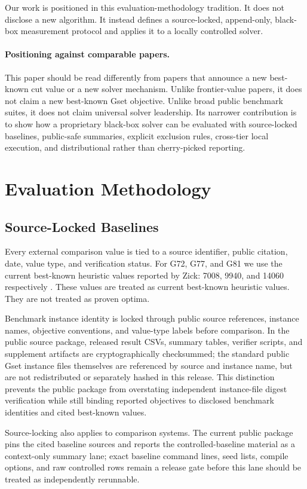 \documentclass[11pt]{article}
\begin{document}
Our work is positioned in this evaluation-methodology tradition. It does not disclose a new algorithm. It instead defines a source-locked, append-only, black-box measurement protocol and applies it to a locally controlled solver.

\paragraph{Positioning against comparable papers.}
This paper should be read differently from papers that announce a new best-known cut value or a new solver mechanism. Unlike frontier-value papers, it does not claim a new best-known Gset objective. Unlike broad public benchmark suites, it does not claim universal solver leadership. Its narrower contribution is to show how a proprietary black-box solver can be evaluated with source-locked baselines, public-safe summaries, explicit exclusion rules, cross-tier local execution, and distributional rather than cherry-picked reporting.

\section{Evaluation Methodology}
\subsection{Source-Locked Baselines}
Every external comparison value is tied to a source identifier, public citation, date, value type, and verification status. For G72, G77, and G81 we use the current best-known heuristic values reported by Zick: 7008, 9940, and 14060 respectively \cite{zick2025}. These values are treated as current best-known heuristic values. They are not treated as proven optima.

Benchmark instance identity is locked through public source references, instance names, objective conventions, and value-type labels before comparison. In the public source package, released result CSVs, summary tables, verifier scripts, and supplement artifacts are cryptographically checksummed; the standard public Gset instance files themselves are referenced by source and instance name, but are not redistributed or separately hashed in this release. This distinction prevents the public package from overstating independent instance-file digest verification while still binding reported objectives to disclosed benchmark identities and cited best-known values.

Source-locking also applies to comparison systems. The current public package pins the cited baseline sources and reports the controlled-baseline material as a context-only summary lane; exact baseline command lines, seed lists, compile options, and raw controlled rows remain a release gate before this lane should be treated as independently rerunnable.
\end{document}

